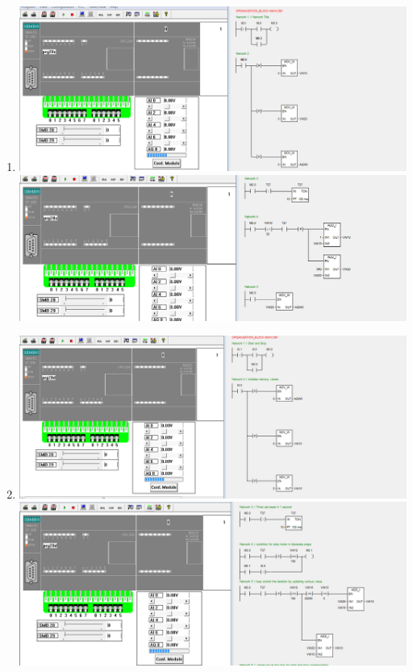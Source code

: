 \documentclass[
	12pt, %
]{fphw}
\begin{document}
\begin{enumerate}
\begin{center}
    \end{center}
  \item
    \begin{center}
      \includegraphics[width = 165mm, scale = 0.9]{prg28c1.png}
      \includegraphics[width = 165mm, scale = 0.9]{prg28c2.png}
    \end{center}
  \item
    \begin{center}
      \includegraphics[width = 165mm, scale = 0.9]{prg28d1.png}
      \includegraphics[width = 165mm, scale = 0.9]{prg28d2.png}

\end{center}
\end{enumerate}
\end{document}
